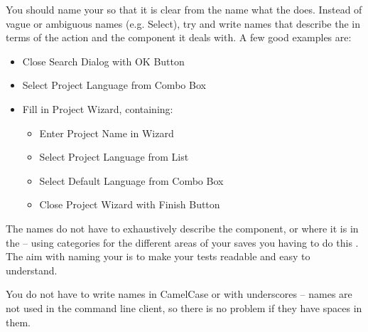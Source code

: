 You should name your \gdcases{} so that it is clear from the name what the \gdcase{} does. Instead of vague or ambiguous names (e.g. Select), try and write names that describe the \gdcase{} in terms of the action and the component it deals with. A few good examples are:

\begin{itemize}
\item Close Search Dialog with OK Button
\item Select Project Language from Combo Box
\item Fill in Project Wizard, containing:
\begin{itemize}
\item Enter Project Name in Wizard
\item Select Project Language from List
\item Select Default Language from Combo Box
\item Close Project Wizard with Finish Button
\end{itemize}
\end{itemize}

The \gdcase{} names do not have to exhaustively describe the component, or where it is in the \gdaut{} -- using categories for the different areas of your \gdaut{} saves you having to do this . The aim with naming your \gdcases{} is to make your tests readable and easy to understand. 

You do not have to write \gdcase{} names in CamelCase or with underscores -- \gdcase{} names are not used in the command line client, so there is no problem if they have spaces in them. 
